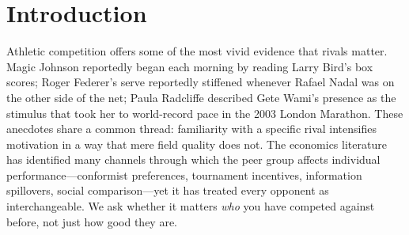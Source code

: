 \documentclass[12pt]{article}
\theoremstyle{definition}
\theoremstyle{remark}
\begin{document}
\begin{titlepage}
\begin{center}
\begin{minipage}{0.92\textwidth}
\begin{abstract}
On the theory side, we extend the conformist peer-effects framework
of \citet{Boucher2024} and \citet{Bernheim1994}
by incorporating a rivalry utility motive inspired by \citet{BenabouTirole2006}
and embedding it in the tournament structure of \citet{LazearRosen1981}.
We show that all eight HOX mechanisms emerge as special cases of a general
best-reply function indexed by the choice of peer statistic and rival weighting,
derive familiarity-amplified equilibria with closed-form comparative statics,
and prove that task complexity enters through the effort cost function and
information precision, generating an inverse-U-shaped familiarity amplification
in race distance.
Importantly, because running is an individual sport with no team production,
our setting fully isolates the rivalry peer effect from the altruistic
motive---the willingness to sacrifice own performance to help teammates---that
confounds peer-effect estimates in team sports.

\vspace{0.4cm}
\noindent\textbf{JEL:} J24, Z22, D83, C23 \quad
\textbf{Keywords:} peer effects, rivalry, track and field, familiarity,
tournament, task complexity, altruism
\end{abstract}
\end{minipage}
\end{center}
\end{titlepage}

\clearpage
\section{Introduction}
\label{sec:intro}

Athletic competition offers some of the most vivid evidence that rivals matter.
Magic Johnson reportedly began each morning by reading Larry Bird's box scores;
Roger Federer's serve reportedly stiffened whenever Rafael Nadal was on the other
side of the net; Paula Radcliffe described Gete Wami's presence as the stimulus
that took her to world-record pace in the 2003 London Marathon.
These anecdotes share a common thread: familiarity with a specific rival
intensifies motivation in a way that mere field quality does not.
The economics literature has identified many channels through which the peer
group affects individual performance---conformist preferences, tournament
incentives, information spillovers, social comparison---yet it has treated
every opponent as interchangeable.
We ask whether it matters \textit{who} you have competed against before,
not just how good they are.
\end{document}
